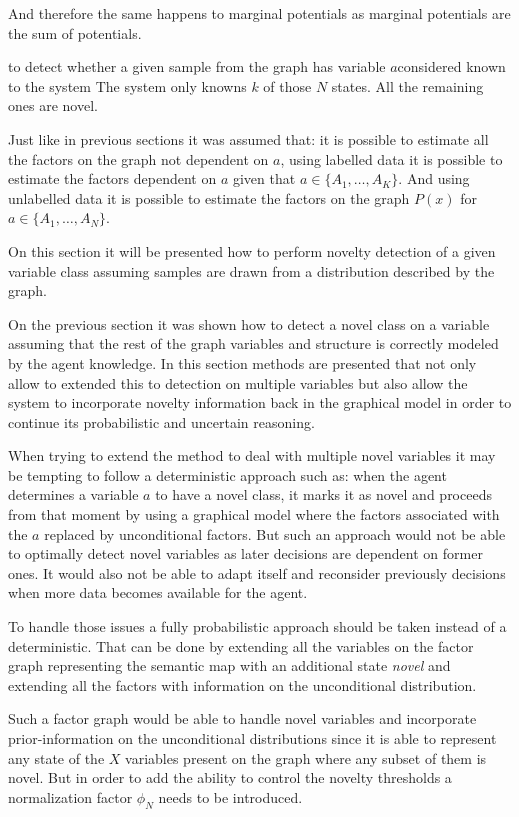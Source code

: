 And therefore the same happens to marginal potentials as marginal potentials
are the sum of potentials.

to detect whether a given sample from the graph has variable
$a$considered known to the system
The system only knowns $k$ of those $N$ states.
All the remaining ones are novel.

Just like in previous sections it was assumed that: it is possible to estimate
all the factors on the graph not dependent on $a$, using labelled data it is
possible to estimate the factors dependent on $a$ given that
$a \in \{A_1,\dotsc,A_K\}$. And using unlabelled data it is possible to estimate
the factors on the graph $P(x)$ for $a \in \{A_1,\dotsc,A_N\}$.


On this section it will be presented how to perform novelty detection of a
given variable class assuming samples are drawn from a distribution described
by the graph.



On the previous section it was shown how to detect a novel class on a variable
assuming that the rest of the graph variables and structure is correctly modeled
by the agent knowledge.
In this section methods are presented that not only allow to extended this to
detection on multiple variables but also allow the system to incorporate
novelty information back in the graphical model in order to continue its
probabilistic and uncertain reasoning.

When trying to extend the method to deal with multiple novel variables it may
be tempting to follow a deterministic approach such as:
when the agent determines a variable $a$ to have a novel class, it marks it as
novel and proceeds from that moment by using a graphical model where the factors
associated with the $a$ replaced by unconditional factors.
But such an approach would not be able to optimally detect novel variables
as later decisions are dependent on former ones.
It would also not be able to adapt itself and reconsider previously decisions
when more data becomes available for the agent.

To handle those issues a fully probabilistic approach should be taken
instead of a deterministic.
That can be done by extending all the variables on the factor graph representing
the semantic map with an additional state \emph{novel} and extending all the
factors with information on the unconditional distribution.

Such a factor graph would be able to handle novel variables and incorporate
prior-information on the unconditional distributions since it is able to
represent any state of the $X$ variables present on the graph where any
subset of them is novel. But in order to add the ability to control the
novelty thresholds a normalization factor $\phi_N$ needs to be introduced.

